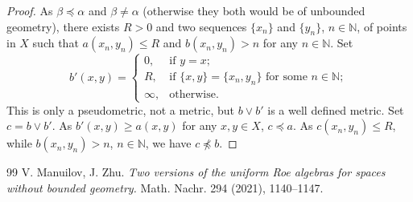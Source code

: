 \documentclass[10pt,a4paper]{amsart}
\numberwithin{equation}{section}
\begin{document}
\begin{proof}
As $\beta\preceq \alpha$ and $\beta\neq \alpha$ (otherwise they both would be of unbounded geometry), there exists $R>0$ and two sequences $\{x_n\}$ and $\{y_n\}$, $n\in\mathbb N$, of points in $X$ such that $a(x_n,y_n)\leq R$ and $b(x_n,y_n)>n$ for any $n\in\mathbb N$. Set 
$$
b'(x,y)=\left\lbrace\begin{array}{cl}0,&\mbox{if\ }y=x;\\R,&\mbox{if\ }\{x,y\}=\{x_n,y_n\}\mbox{\ for\ some\ }n\in\mathbb N;\\\infty,&\mbox{otherwise}.\end{array}\right.
$$   
This is only a pseudometric, not a metric, but $b\lor b'$ is a well defined metric. Set $c=b\lor b'$. As $b'(x,y)\geq a(x,y)$ for any $x,y\in X$, $c\preceq a$. As $c(x_n,y_n)\leq R$, while $b(x_n,y_n)>n$, $n\in\mathbb N$, we have $c\npreceq b$.    
\end{proof}


\begin{thebibliography}{99}
 V. Manuilov, J. Zhu. \textit{Two versions of the uniform Roe algebras for spaces without bounded geometry.} Math. Nachr. 294 (2021), 1140--1147.
\end{thebibliography}
\end{document}
